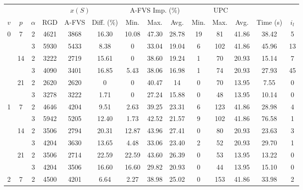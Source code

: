 \begin{tabular}{|ccc|ccc|ccc|ccc|c|c|}
\toprule
  &    &   & \multicolumn{3}{|c|}{$x(S)$} & \multicolumn{3}{|c|}{A-FVS Imp. (\%)} & \multicolumn{3}{|c|}{UPC} &   &  \\
  $v$ & $p$ & $\alpha$ & RGD & A-FVS & Diff. (\%) & Min. & Max. & Avg. & Min. & Max. & Avg. &  Time (s) & $i_l$ \\
\midrule
\multirow{6}{*}{0} & \multirow{2}{*}{7} & 2 &  4621 &   3868 & 16.30 &   10.08 &   47.30 &   28.78 &   19 &   81 &   41.86 & 38.42 &     5 \\
  &    & 3 &  5930 &   5433 &  8.38 &    0 &   33.04 &   19.04 &    6 &  102 &   41.86 & 45.96 &    13 \\
\cline{2-14}
  & \multirow{2}{*}{14} & 2 &  3222 &   2719 & 15.61 &    0 &   38.60 &   19.24 &    1 &   70 &   20.93 & 15.14 &     7 \\
  &    & 3 &  4090 &   3401 & 16.85 &    5.43 &   38.06 &   16.98 &    1 &   74 &   20.93 & 27.93 &    45 \\
\cline{2-14}
  & \multirow{2}{*}{21} & 2 &  2620 &   2620 &  0 &    0 &   40.47 &   14 &    0 &   70 &   13.95 &  7.55 &     0 \\
  &    & 3 &  3278 &   3222 &  1.71 &    0 &   27.24 &   15.88 &    0 &   48 &   13.95 & 10.14 &     0 \\
\cline{1-14}
\cline{2-14}
\multirow{6}{*}{1} & \multirow{2}{*}{7} & 2 &  4646 &   4204 &  9.51 &    2.63 &   39.25 &   23.31 &    6 &  123 &   41.86 & 28.98 &     4 \\
  &    & 3 &  5942 &   5205 & 12.40 &    1.73 &   42.52 &   21.57 &    9 &  102 &   41.86 & 76.58 &     1 \\
\cline{2-14}
  & \multirow{2}{*}{14} & 2 &  3506 &   2794 & 20.31 &   12.87 &   43.96 &   27.41 &    0 &   80 &   20.93 & 23.63 &     3 \\
  &    & 3 &  4204 &   3630 & 13.65 &    4.48 &   33.06 &   23.40 &    2 &   52 &   20.93 & 29.70 &     1 \\
\cline{2-14}
  & \multirow{2}{*}{21} & 2 &  3506 &   2714 & 22.59 &   22.59 &   43.60 &   26.39 &    0 &   53 &   13.95 & 13.22 &     0 \\
  &    & 3 &  4204 &   3506 & 16.60 &   16.60 &   29.82 &   20.93 &    0 &   44 &   13.95 & 15.10 &     0 \\
\cline{1-14}
\cline{2-14}
\multirow{6}{*}{2} & \multirow{2}{*}{7} & 2 &  4500 &   4201 &  6.64 &    2.27 &   38.98 &   25.02 &    0 &  153 &   41.86 & 33.98 &     2 \\

\end{tabular}
